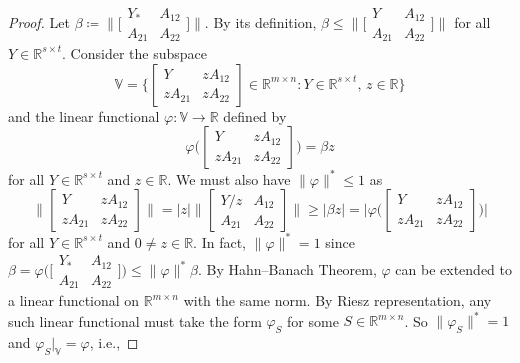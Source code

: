 \documentclass[11pt,reqno]{amsart}
\theoremstyle{definition}
\numberwithin{equation}{section}
\newcommand{\R}{\mathbb{R}}
\begin{document}
\begin{proof}
Let $\beta \coloneqq \bigl \lVert \bigl[\begin{smallmatrix}
    Y_* & A_{12} \\
A_{21} & A_{22}
\end{smallmatrix}\bigr]  \bigr\rVert$. By its definition, $\beta \le \bigl \lVert \bigl[\begin{smallmatrix}
    Y & A_{12} \\
A_{21} & A_{22}
\end{smallmatrix}\bigr]  \bigr\rVert$ for all $Y \in \R^{s \times t}$. Consider the subspace
\[
\mathbb{V} = \biggl\{ \begin{bmatrix}
    Y &zA_{12}\\
    zA_{21} &zA_{22}
\end{bmatrix} \in \R^{m \times n} : Y \in \R^{s\times t},\, z \in \R  \biggr\}
\]
and the linear functional $\varphi : \mathbb{V} \to \mathbb{R}$ defined by
\[
\varphi\biggl(\begin{bmatrix} 
    Y &zA_{12}\\
    zA_{21} &zA_{22}
\end{bmatrix}\biggr) = \beta z
\]
for all $Y \in \R^{s\times t}$ and $z \in \R$. 
We must also have $\lVert \varphi\rVert^* \le 1$ as
\[
\biggl\lVert \begin{bmatrix}
    Y &zA_{12}\\
    zA_{21} &zA_{22}
\end{bmatrix} \biggr\rVert = \lvert z \rvert \biggl\lVert \begin{bmatrix}
    Y/z &A_{12}\\
    A_{21} & A_{22}
\end{bmatrix} \biggr\rVert \ge \lvert  \beta z\rvert =  \biggl\lvert \varphi \biggl( \begin{bmatrix} 
    Y &zA_{12}\\
    zA_{21} &zA_{22}
\end{bmatrix} \biggr) \biggr\rvert
\]
for all $Y\in \R^{s \times t}$  and $0 \ne z \in \R$.
In fact, $\lVert  \varphi\rVert^* = 1$ since $\beta =  \varphi\bigl(  \bigl[\begin{smallmatrix}
    Y_* & A_{12} \\
A_{21} & A_{22}
\end{smallmatrix}\bigr] \bigr) \le \lVert \varphi \rVert^* \beta$. By Hahn--Banach Theorem, $\varphi$ can be extended to a linear functional on $\R^{m\times n}$ with the same norm. By Riesz representation, any such linear functional must take the form $\varphi_S$ for some $S  \in \R^{m\times n}$.  So  $\lVert \varphi_S\rVert^* = 1$ and $\varphi_S \bigr\rvert_{\mathbb{V}} =\varphi$, i.e.,

\end{proof}
\end{document}

